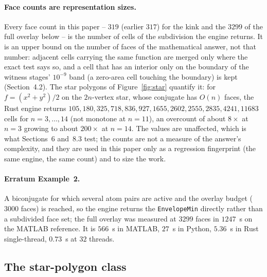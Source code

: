\documentclass[11pt]{article}
\theoremstyle{definition}
\begin{document}
\paragraph{Face counts are representation sizes.}
Every face count in this paper -- $319$ (earlier $317$) for the kink and the $3299$ of the full overlay below -- is
the number of cells of the subdivision the engine returns. It is an upper bound
on the number of faces of the mathematical answer, not that number: adjacent
cells carrying the same function are merged only where the exact test says so,
and a cell that has an interior only on the boundary of the witness stages'
$10^{-9}$ band (a zero-area cell touching the boundary) is kept
(Section~4.2). The star polygons of Figure~\ref{fig:star} quantify it: for
$f=(x^2+y^2)/2$ on the $2n$-vertex star, whose conjugate has $O(n)$ faces, the
Rust engine returns $105, 180, 325, 718, 836, 927, 1655, 2602, 2555, 2835,
4241, 11683$ cells for $n=3,\ldots,14$ (not monotone at $n=11$), an overcount of
about $8\times$ at $n=3$ growing to about $200\times$ at $n=14$. The values are
unaffected, which is what Sections~6 and~8.3 test; the counts are not a measure of
the answer's complexity, and they are used in this paper only as a
regression fingerprint (the same engine, the same count) and to size the
work.

\paragraph{Erratum Example~2.}
A biconjugate for which several atom pairs are active and the overlay budget
($3000$ faces) is reached, so the engine returns the \texttt{EnvelopeMin}
directly rather than a subdivided face set; the full overlay was measured at
$3299$ faces in $1247$~s on the MATLAB reference. It is $566$~s in MATLAB,
$27$~s in Python, $5.36$~s in Rust single-thread, $0.73$~s at $32$ threads.

\subsection{The star-polygon class}
\end{document}
